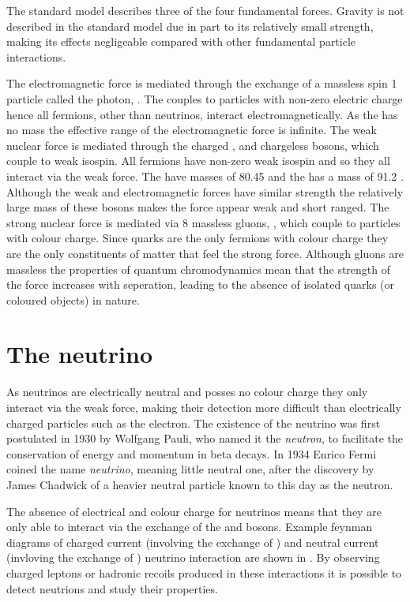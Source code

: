 The standard model describes three of the four fundamental forces. Gravity is not described in the standard model due in part to its relatively small strength, making its effects negligeable compared with other fundamental particle interactions.

The electromagnetic force is mediated through the exchange of a massless spin 1 particle called the photon, \Pphoton. The \Pphoton couples to particles with non-zero electric charge hence all fermions, other than neutrinos, interact electromagnetically. As the \Pphoton has no mass the effective range of the electromagnetic force is infinite. The weak nuclear force is mediated through the charged \PWplus, \PWminus and chargeless \PZzero bosons, which couple to weak isospin. All fermions have non-zero weak isospin and so they all interact via the weak force. The \PWpm have masses of 80.45 \GeV and the \PZzero has a mass of 91.2 \GeV. Although the weak and electromagnetic forces have similar strength the relatively large mass of these bosons makes the force appear weak and short ranged. The strong nuclear force is mediated via 8 massless gluons, \Pgluon, which couple to particles with colour charge. Since quarks are the only fermions with colour charge they are the only constituents of matter that feel the strong force. Although gluons are massless the properties of quantum chromodynamics mean that the strength of the force increases with seperation, leading to the absence of isolated quarks (or coloured objects) in nature.



\section{The neutrino}

As neutrinos are electrically neutral and posses no colour charge they only interact via the weak force, making their detection more difficult than electrically charged particles such as the electron. The existence of the neutrino was first postulated in 1930 by Wolfgang Pauli, who named it the \textit{neutron}, to facilitate the conservation of energy and momentum in beta decays. In 1934 Enrico Fermi coined the name \textit{neutrino}, meaning little neutral one, after the discovery by James Chadwick of a heavier neutral particle known to this day as the neutron.

The absence of electrical and colour charge for neutrinos means that they are only able to interact via the exchange of the \PWpm and \PZzero bosons. Example feynman diagrams of charged current (involving the exchange of \PWpm) and neutral current (invloving the exchange of \PZzero) neutrino interaction are shown in . By observing charged leptons or hadronic recoils produced in these interactions it is possible to detect neutrions and study their properties.

